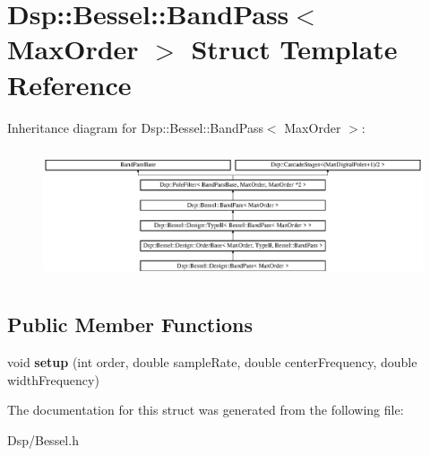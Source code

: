 \hypertarget{structDsp_1_1Bessel_1_1BandPass}{\section{Dsp\-:\-:Bessel\-:\-:Band\-Pass$<$ Max\-Order $>$ Struct Template Reference}
\label{structDsp_1_1Bessel_1_1BandPass}
}
Inheritance diagram for Dsp\-:\-:Bessel\-:\-:Band\-Pass$<$ Max\-Order $>$\-:\begin{figure}[H]
\begin{center}
\leavevmode
\includegraphics[height=3.897912cm]{structDsp_1_1Bessel_1_1BandPass}
\end{center}
\end{figure}
\subsection*{Public Member Functions}
\begin{DoxyCompactItemize}
\item 
\hypertarget{structDsp_1_1Bessel_1_1BandPass_aa996096394a18c1b30d0a0d7bae59d57}{void {\bfseries setup} (int order, double sample\-Rate, double center\-Frequency, double width\-Frequency)}\label{structDsp_1_1Bessel_1_1BandPass_aa996096394a18c1b30d0a0d7bae59d57}

\end{DoxyCompactItemize}


The documentation for this struct was generated from the following file\-:\begin{DoxyCompactItemize}
\item 
Dsp/Bessel.\-h\end{DoxyCompactItemize}
